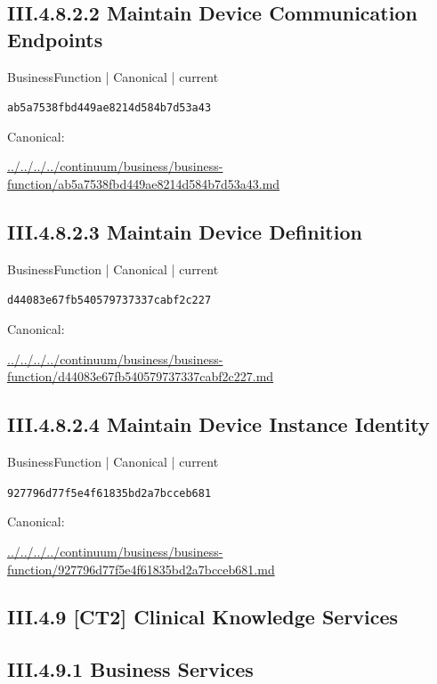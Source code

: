 \documentclass[10pt,a4paper]{article}
\begin{document}
\subsection*{III.4.8.2.2 Maintain Device Communication Endpoints}
{\small BusinessFunction | Canonical | current}\par
\texttt{ab5a7538fbd449ae8214d584b7d53a43}\par
Canonical: \par
{\footnotesize\url{../../../../continuum/business/business-function/ab5a7538fbd449ae8214d584b7d53a43.md}}\par
\subsection*{III.4.8.2.3 Maintain Device Definition}
{\small BusinessFunction | Canonical | current}\par
\texttt{d44083e67fb540579737337cabf2c227}\par
Canonical: \par
{\footnotesize\url{../../../../continuum/business/business-function/d44083e67fb540579737337cabf2c227.md}}\par
\subsection*{III.4.8.2.4 Maintain Device Instance Identity}
{\small BusinessFunction | Canonical | current}\par
\texttt{927796d77f5e4f61835bd2a7bcceb681}\par
Canonical: \par
{\footnotesize\url{../../../../continuum/business/business-function/927796d77f5e4f61835bd2a7bcceb681.md}}\par
\subsection*{III.4.9 [CT2] Clinical Knowledge Services}
\subsection*{III.4.9.1 Business Services}
\end{document}
